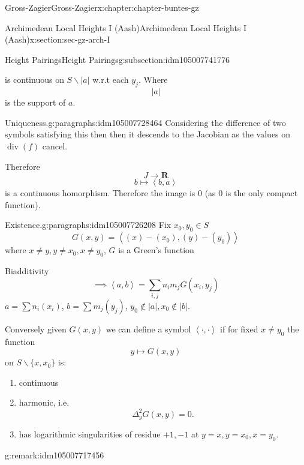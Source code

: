 \documentclass[oneside,10pt,]{book}
\numberwithin{equation}{section}
\newcommand{\pair}[2]{\left\langle #1, #2 \right\rangle}
\newcommand{\RR}{\mathbf{R}}
\DeclareMathOperator{\divisor}{div}
\begin{document}
\begin{chapterptx}{Gross-Zagier}{}{Gross-Zagier}{}{}{x:chapter:chapter-buntes-gz}
\begin{sectionptx}{Archimedean Local Heights I (Aash)}{}{Archimedean Local Heights I (Aash)}{}{}{x:section:sec-gz-arch-I}
\begin{subsectionptx}{Height Pairings}{}{Height Pairings}{}{}{g:subsection:idm105007741776}
\begin{enumerate}
\begin{equation*}
\end{equation*}
is continuous on \(S\smallsetminus |a|\) w.r.t each \(y_j\). Where%
\begin{equation*}
|a|
\end{equation*}
is the support of \(a\).%
\end{enumerate}
%
\begin{paragraphs}{Uniqueness.}{g:paragraphs:idm105007728464}%
Considering the difference of two symbols satisfying this then then it descends to the Jacobian as the values on \(\divisor(f)\) cancel.%
\par
Therefore%
\begin{equation*}
J\to \RR
\end{equation*}
%
\begin{equation*}
b\mapsto \pair b a
\end{equation*}
is a continuous homorphism. Therefore the image is 0 (as 0 is the only compact function).%
\end{paragraphs}%
\begin{paragraphs}{Existence.}{g:paragraphs:idm105007726208}%
Fix \(x_0, y_0 \in S\)%
\begin{equation*}
G(x,y)  = \pair{(x)  - (x_0)}{ (y) - (y_0)}
\end{equation*}
where \(x\ne y,y\ne x_0,x\ne y_0\), \(G\) is a Green's function%
\par
Biadditivity%
\begin{equation*}
\implies \pair ab = \sum_{i,j} n_i m_j G(x_i, y_j)
\end{equation*}
\(a = \sum n_i(x_i)\), \(b = \sum m_j(y_j)\), \(y_0 \not \in |a|,x_0 \not \in |b|\).%
\par
Conversely given \(G(x,y)\) we can define a symbol \(\pair \cdot \cdot\) if for fixed \(x \ne y_0\) the function%
\begin{equation*}
y \mapsto G(x,y)
\end{equation*}
on \(S\smallsetminus\{x,x_0\}\) is:%
\begin{enumerate}
\item{}continuous%
\item{}harmonic, i.e.%
\begin{equation*}
\Delta _y^2 G(x,y) = 0\text{.}
\end{equation*}
%
\item{}has logarithmic singularities of residue \(+1,-1\) at \(y=x,y=x_0, x=y_0\).%
\end{enumerate}
%
\begin{remark}{}{g:remark:idm105007717456}%

\end{remark}
\end{paragraphs}
\end{subsectionptx}
\end{sectionptx}
\end{chapterptx}
\end{document}
